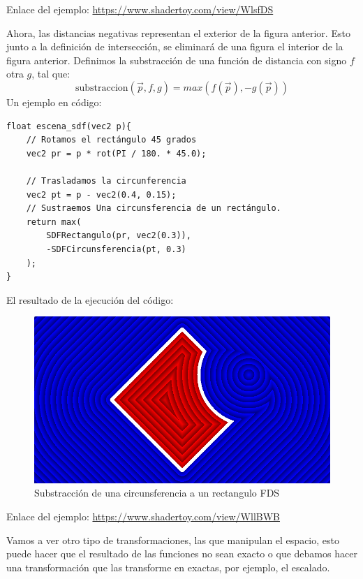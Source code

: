 Enlace del ejemplo:
\url{https://www.shadertoy.com/view/WlsfDS}

Ahora, las distancias negativas representan el exterior de la figura anterior. Esto junto a la definición de intersección, se eliminará de una figura el interior de la figura anterior. Definimos la substracción de una función de distancia con signo \(f\) otra \(g\), tal que:
\[\text{substraccion}(\Vec{p}, f,g)=max(f(\Vec{p}), -g(\Vec{p}))\]
Un ejemplo en código:
\begin{lstlisting}
float escena_sdf(vec2 p){
    // Rotamos el rectángulo 45 grados
    vec2 pr = p * rot(PI / 180. * 45.0);
    
    // Trasladamos la circunferencia
    vec2 pt = p - vec2(0.4, 0.15);
    // Sustraemos Una circunsferencia de un rectángulo.
    return max(
        SDFRectangulo(pr, vec2(0.3)),
        -SDFCircunsferencia(pt, 0.3)
    );
}
\end{lstlisting}
El resultado de la ejecución del código:
\begin{figure}[H]
  \centering
  \captionsetup{justification=centering}%
  \includegraphics[width=1.0\textwidth]{secciones/imagenes/sdf/2d/sdf_subtract-3.png}
  \caption{Substracción de una circunsferencia a un rectangulo FDS}
  \label{fig:substraction}
\end{figure}

Enlace del ejemplo:
\url{https://www.shadertoy.com/view/WllBWB}

Vamos a ver otro tipo de transformaciones, las que manipulan el espacio, esto puede hacer que el resultado de las funciones no sean exacto o que debamos hacer una transformación que las transforme en exactas, por ejemplo, el escalado.

